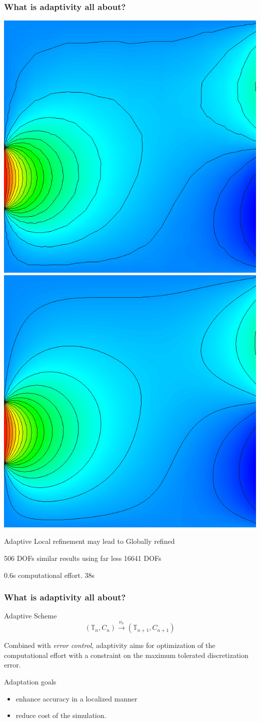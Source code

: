 \begin{frame}
  \frametitle<presentation>{What is adaptivity all about?}
  \begin{center}
    \includegraphics[width=.45\textwidth]{EPS/adaptivity/adaptive_iso} \hfill
    \includegraphics[width=.45\textwidth]{EPS/adaptivity/fine_iso}

    Adaptive     \hfill \hspace{7ex}Local refinement may lead to   \hfill Globally refined

    506 DOFs     \hfill \hspace{3ex}similar results using far less \hfill 16641 DOFs

    \alert{0.6s} \hfill computational effort.                      \hfill \alert{38s}

  \end{center}
\end{frame}

\begin{frame}
  \frametitle<presentation>{What is adaptivity all about?} 

  Adaptive Scheme
  \[
  (\mathbb{T}_n,C_{n}) \stackrel{\nu_n}{\rightarrow} (\mathbb{T}_{n+1},C_{n+1})
  \]

  Combined with \emph{error control}, adaptivity aims for optimization of the computational effort with a constraint on the maximum tolerated discretization error.

  \begin{block}{Adaptation goals}
    \begin{itemize}
      \item enhance accuracy in a localized manner
      \item reduce cost of the simulation.
    \end{itemize}
  \end{block}
\end{frame}

